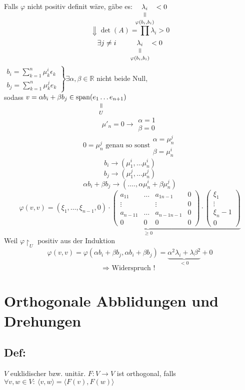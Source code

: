 \documentclass[titlepage,12pt,a4paper,ngerman]{report}
\newcommand{\verteq}{\rotatebox{90}{$\,=$}}
\newcommand{\equalto}[2]{\underset{\scriptstyle\overset{\mkern4mu\verteq}{#2}}{#1}}
\newcommand{\tx}[1]{\textrm{#1}}
\newcommand{\ub}[1]{\underbrace{#1}}
\newcommand{\spa}{\tx{span}}
\newcommand{\summ}[2]{\sum_{#1}^{#2}}
\newcommand{\ska}[2]{\langle #1 , #2 \rangle}
\begin{document}
Falls $ \varphi $ nicht positiv definit wäre, gäbe es: $ \equalto{\lambda_i}{\varphi(b_i,b_i)} < 0 $
$$ \Downarrow \det(A) = \prod \lambda_i > 0$$
$$ \exists j \neq i \qquad \equalto{\lambda_i}{\varphi(b_i,b_i)} < 0$$
$\left. \begin{array}{l}
b_i = \summ{k=1}{n} \mu_k^i \epsilon_k \\ b_j = \summ{k=1}{n} \mu_k^j e_k
\end{array} \right \} \exists \alpha, \beta \in \mathbb R $ nicht beide Null,\\[10pt]
sodass $v = \alpha b_i + \beta b_j \in \equalto{\spa (e_1 \dots e_{n+1})}{U}$ 
$$\mu'_n = 0 \rightarrow \begin{array}{c}
\alpha = 1 \\ \beta = 0
\end{array}$$
$$0 = \mu^j_n \tx{ genau so sonst} \begin{array}{c}
\alpha = \mu_n^j \\ \beta = \mu_n^i
\end{array}$$
$$b_i \rightarrow (\mu_1^i,\dots \mu_n^i)$$
$$b_j \rightarrow (\mu_1^j,\dots \mu_n^j)$$
$$\alpha b_i + \beta b_j \rightarrow (\dots., \alpha \mu^i_n + \beta \mu_n^j)$$
$$ \varphi(v,v) = \ub{( \xi_1, \dots , \xi_{n-1},0) \cdot \begin{pmatrix}
	a_{11} & \dots & a_{1n-1}& 0\\
	\vdots & & \vdots & 0\\
	a_{n-1 1} & \dots & a_{n-1 n-1} & 0\\
	0 & 0 & 0 & 0
	\end{pmatrix}\cdot \begin{pmatrix}
	\xi_1\\
	\vdots\\
	\xi_n-1\\
	0
	\end{pmatrix}}_{\ge 0}$$
Weil $ \varphi \upharpoonright_U $ positiv aus der Induktion
$$ \varphi(v,v) = \varphi( \alpha b_i + \beta b_j , \alpha b_i + \beta b_j) = \ub{ \alpha^2 \lambda _i + \lambda \beta^2 }_{< 0} + 0$$
$$\Rightarrow \tx{ Widerspruch ! }$$

\section{Orthogonale Abblidungen und Drehungen}
\subsection{Def:} $V$ euklidischer bzw. unitär. $F:V \to V$ ist orthogonal, falls $\forall v,w \in V:\ \ska{v}{w} = \ska{F(v)}{F(w)}$
\end{document}
